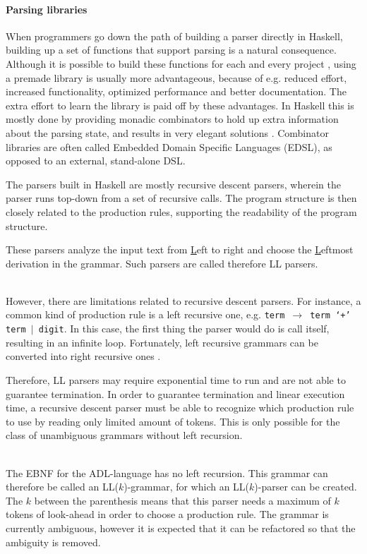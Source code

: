 \paragraph{Parsing libraries}
%
When programmers go down the path of building a parser directly in Haskell, building up a set of functions that support parsing is a natural consequence.
Although it is possible to build these functions for each and every project , using a premade library is usually more advantageous, because of e.g. reduced effort, increased functionality, optimized performance and better documentation.
The extra effort to learn the library is paid off by these advantages.
In Haskell this is mostly done by providing monadic combinators to hold up extra information about the parsing state, and results in very elegant solutions .
Combinator libraries are often called Embedded Domain Specific Languages (EDSL), as opposed to an external, stand-alone DSL.

The parsers built in Haskell are mostly recursive descent parsers, wherein the parser runs top-down from a set of recursive calls.
The program structure is then closely related to the production rules, supporting the readability of the program structure.

These parsers analyze the input text from \underline{L}eft to right and choose the \underline{L}eftmost derivation in the grammar.
Such parsers are called therefore LL parsers.

~\\
However, there are limitations related to recursive descent parsers.
For instance, a common kind of production rule is a left recursive one, e.g. \texttt{term $\rightarrow$ term `$+$' term $|$ digit}.
In this case, the first thing the parser would do is call itself, resulting in an infinite loop.
Fortunately, left recursive grammars can be converted into right recursive ones .

Therefore, LL parsers may require exponential time to run and are not able to guarantee termination.
In order to guarantee termination and linear execution time, a recursive descent parser must be able to recognize which production rule to use by reading only limited amount of tokens.
This is only possible for the class of unambiguous grammars without left recursion.

~\\
%
%
The EBNF for the ADL-language has no left recursion.
This grammar can therefore be called an LL($k$)-grammar, for which an LL($k$)-parser can be created.
The $k$ between the parenthesis means that this parser needs a maximum of $k$ tokens of look-ahead in order to choose a production rule.
The grammar is currently ambiguous, however it is expected that it can be refactored so that the ambiguity is removed.

